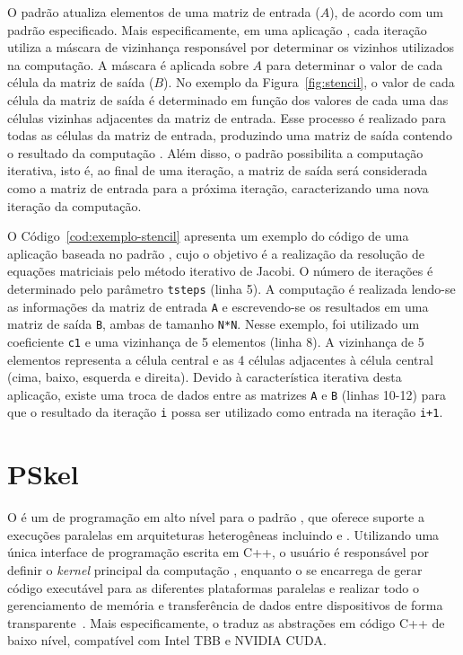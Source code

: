 O padrão \stencil atualiza elementos de uma matriz de entrada ($A$),
de acordo com um padrão especificado. Mais especificamente, em uma aplicação
\stencil, cada iteração utiliza a máscara de vizinhança responsável por determinar os vizinhos
utilizados na computação. A máscara é aplicada sobre $A$ para determinar o valor de cada
célula da matriz de saída ($B$). No exemplo da Figura~\ref{fig:stencil}, o
valor de cada célula da matriz de saída é determinado em função dos
valores de cada uma das células vizinhas adjacentes da matriz de entrada. Esse processo é realizado
para todas as células da matriz de entrada, produzindo uma matriz de saída
contendo o resultado da computação \stencil. Além disso, o padrão possibilita a computação
iterativa, isto é, ao final de uma iteração, a matriz de saída será
considerada como a matriz de entrada para a próxima iteração,
caracterizando uma nova iteração da computação.

O Código~\ref{cod:exemplo-stencil} apresenta um exemplo do código de uma aplicação baseada no padrão
\stencil, cujo o objetivo é a realização da resolução de equações matriciais pelo método iterativo de Jacobi.
O número de iterações é determinado pelo parâmetro \texttt{tsteps} (linha 5). A computação
\stencil é realizada lendo-se as informações da matriz de entrada \texttt{A} e escrevendo-se os resultados em uma matriz de saída \texttt{B}, ambas de tamanho \texttt{N*N}.
Nesse exemplo, foi utilizado um coeficiente \texttt{c1} e uma vizinhança de 5 elementos (linha 8). A vizinhança de 5 elementos
representa a célula central e as 4 células adjacentes à célula central (cima, baixo, esquerda e direita).
Devido à característica iterativa desta aplicação, existe uma troca de dados entre as matrizes \texttt{A} e \texttt{B}
(linhas 10-12) para que o resultado da iteração \texttt{i} possa ser utilizado como entrada na iteração
\texttt{i+1}.


\section{PSkel}
\label{sec:pskel}

O \pskel é um \fw de programação em alto nível para o padrão \stencil, que
oferece suporte a execuções paralelas em arquiteturas heterogêneas incluindo \cpu
e \gpu. Utilizando uma única interface de programação escrita em C++, o usuário é
responsável por definir o \textit{kernel} principal da computação \stencil,
enquanto o \fw se encarrega de gerar código executável para as diferentes
plataformas paralelas e realizar todo o gerenciamento de memória e transferência
de dados entre dispositivos de forma transparente~\cite{pereira15}. Mais
especificamente, o \pskel traduz as abstrações em código C++ de baixo nível,
compatível com Intel TBB e NVIDIA CUDA.

